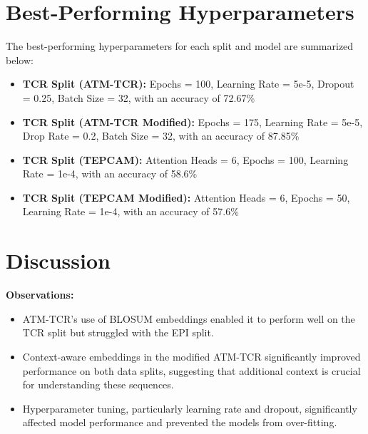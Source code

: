 \documentclass[11pt,a4paper]{article}
\begin{document}
\section{Best-Performing Hyperparameters}
The best-performing hyperparameters for each split and model are summarized below:
\begin{itemize}
    \item \textbf{TCR Split (ATM-TCR):} Epochs = 100, Learning Rate = 5e-5, Dropout = 0.25, Batch Size = 32, with an accuracy of 72.67\%
    \item \textbf{TCR Split (ATM-TCR Modified):} Epochs = 175, Learning Rate = 5e-5, Drop Rate = 0.2, Batch Size = 32, with an accuracy of 87.85\%
    \item \textbf{TCR Split (TEPCAM):} Attention Heads = 6, Epochs = 100, Learning Rate = 1e-4, with an accuracy of 58.6\%
    \item \textbf{TCR Split (TEPCAM Modified):} Attention Heads = 6, Epochs = 50, Learning Rate = 1e-4, with an accuracy of 57.6\%
\end{itemize}

\section{Discussion}
\textbf{Observations:}
\begin{itemize}
    \item ATM-TCR's use of BLOSUM embeddings enabled it to perform well on the TCR split but struggled with the EPI split.
    \item Context-aware embeddings in the modified ATM-TCR significantly improved performance on both data splits, suggesting that additional context is crucial for understanding these sequences.
    \item Hyperparameter tuning, particularly learning rate and dropout, significantly affected model performance and prevented the models from over-fitting.
\end{itemize}
\end{document}
